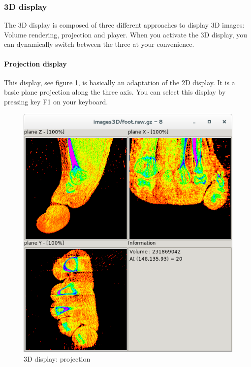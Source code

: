 \documentclass[a4paper,10pt,oneside]{article}
\begin{document}
\subsubsection{3D display}

The 3D display is composed of three different approaches to display 3D images:
Volume rendering, projection and player. When you activate the 3D display,
you can dynamically switch between the three at your convenience.


\paragraph{Projection display}

This display, see figure \ref{fig:dis3D_proj}, is basically an adaptation of
the 2D display. It is a basic plane projection along the three axis.
You can select this display by pressing key F1 on your keyboard.

\begin{figure}
\centering
\includegraphics[scale=0.5]{images/dis3D_proj.png}
\caption{3D display: projection}
\label{fig:dis3D_proj}
\end{figure}
\end{document}

